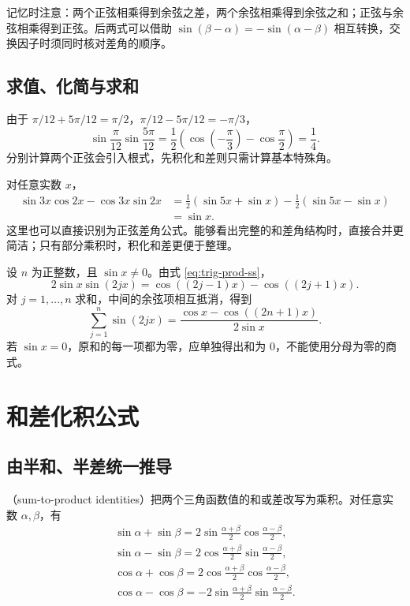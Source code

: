 \documentclass[UTF8]{ctexart}
\begin{document}
记忆时注意：两个正弦相乘得到余弦之差，两个余弦相乘得到余弦之和；正弦与余弦相乘得到正弦。后两式可以借助 $\sin(\beta-\alpha)=-\sin(\alpha-\beta)$ 相互转换，交换因子时须同时核对差角的顺序。

\subsection{求值、化简与求和}

\begin{example}[乘积求值]
由于 $\pi/12+5\pi/12=\pi/2$，$\pi/12-5\pi/12=-\pi/3$，
\[
  \sin\frac\pi{12}\sin\frac{5\pi}{12}
  =\frac12\left(\cos\left(-\frac\pi3\right)-\cos\frac\pi2\right)
  =\frac14.
\]
分别计算两个正弦会引入根式，先积化和差则只需计算基本特殊角。
\end{example}

\begin{example}[消去中间频率]
对任意实数 $x$，
\begin{align*}
  \sin3x\cos2x-\cos3x\sin2x
  &=\frac12(\sin5x+\sin x)-\frac12(\sin5x-\sin x)\\
  &=\sin x.
\end{align*}
这里也可以直接识别为正弦差角公式。能够看出完整的和差角结构时，直接合并更简洁；只有部分乘积时，积化和差更便于整理。
\end{example}

\begin{example}[乘积形式的有限和]
设 $n$ 为正整数，且 $\sin x\ne0$。由式 \eqref{eq:trig-prod-ss}，
\[
  2\sin x\sin(2jx)=\cos((2j-1)x)-\cos((2j+1)x).
\]
对 $j=1,\ldots,n$ 求和，中间的余弦项相互抵消，得到
\[
  \sum_{j=1}^{n}\sin(2jx)
  =\frac{\cos x-\cos((2n+1)x)}{2\sin x}.
\]
若 $\sin x=0$，原和的每一项都为零，应单独得出和为 $0$，不能使用分母为零的商式。
\end{example}

\section{和差化积公式}
\label{sec:trig-sum-to-product}

\subsection{由半和、半差统一推导}

（sum-to-product identities）把两个三角函数值的和或差改写为乘积。对任意实数 $\alpha,\beta$，有
\begin{align}
  \boxed{\sin\alpha+\sin\beta
  =2\sin\frac{\alpha+\beta}{2}\cos\frac{\alpha-\beta}{2}},\label{eq:trig-sum-ss}\\
  \boxed{\sin\alpha-\sin\beta
  =2\cos\frac{\alpha+\beta}{2}\sin\frac{\alpha-\beta}{2}},\label{eq:trig-diff-ss}\\
  \boxed{\cos\alpha+\cos\beta
  =2\cos\frac{\alpha+\beta}{2}\cos\frac{\alpha-\beta}{2}},\label{eq:trig-sum-cc}\\
  \boxed{\cos\alpha-\cos\beta
  =-2\sin\frac{\alpha+\beta}{2}\sin\frac{\alpha-\beta}{2}}.\label{eq:trig-diff-cc}
\end{align}
\end{document}
